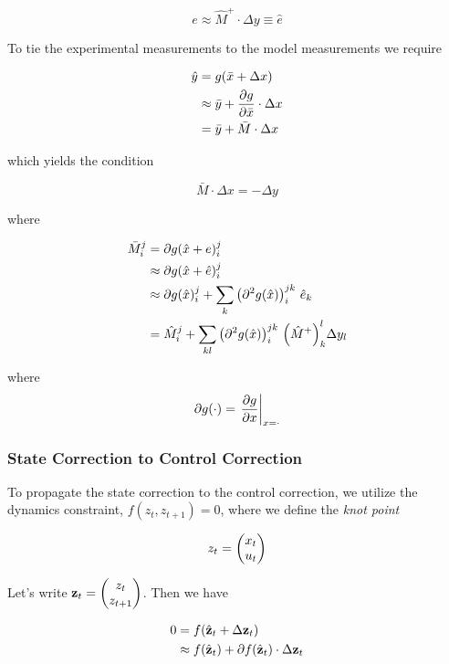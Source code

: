 \documentclass{article}
\begin{document}
$$
\boxed{
e \approx \hat M^+ \cdot \Delta y \equiv \hat e 
}
$$



To tie the experimental measurements to the model measurements we require 

\begin{align*}
\hat y &= g(\bar x + \Delta x) \\ 
&\approx \bar y + \pdv{g}{\bar x} \cdot \Delta x \\
&= \bar y + \bar M \cdot \Delta x
\end{align*}


which yields the condition

\begin{equation}
  \boxed{
  \bar M \cdot \Delta x = - \Delta y
  }
\end{equation}



where

\begin{align*}
  \bar M_i^j &= \partial g(\hat x + e)_i^j \\
  & \approx  \partial g(\hat x + \hat e)_i^j \\
  & \approx \partial g(\hat x)_i^j + \sum_k \qty(\partial^2 g(\hat x))_i^{jk} \ \hat e_k \\
  &= \hat M_i^j + \sum_{kl} \qty(\partial^2 g(\hat x))_i^{jk} \ \qty(\hat M^+)_k^l \Delta y_l 
\end{align*}

where 
$$
\partial g(\cdot) = \eval{\pdv{g}{x}}_{x = \cdot} 
$$

\subsubsection*{State Correction to Control Correction}

To propagate the state correction to the control correction, we utilize the dynamics constraint, $f(z_t, z_{t+1}) = 0$, where we define the \textit{knot point} 

$$
z_t =\mqty(x_t \\ u_t)
$$


Let's write $\vb{z}_t = \mqty(z_t \\ z_{t+1})$. Then we have

\begin{align*}
0 &= f( \hat{\vb{z}}_t + \Delta {\vb{z}}_t) \\
&\approx f(\hat{\vb{z}}_t) + \partial f(\hat{\vb{z}}_t) \cdot \Delta {\vb{z}}_t \\
\end{align*}
\end{document}
